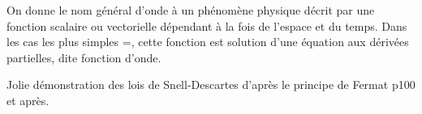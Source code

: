 \documentclass[12pt,a4paper]{article}
\author{Rémi Metzdorff}
\begin{document}
On donne le nom général d'onde à un phénomène physique décrit par une fonction scalaire ou vectorielle dépendant à la fois de l'espace et du temps. Dans les cas les plus simples =, cette fonction est solution d'une équation aux dérivées partielles, dite fonction d'onde.

Jolie démonstration des lois de Snell-Descartes d'après le principe de Fermat p100 et après.
\end{document}
